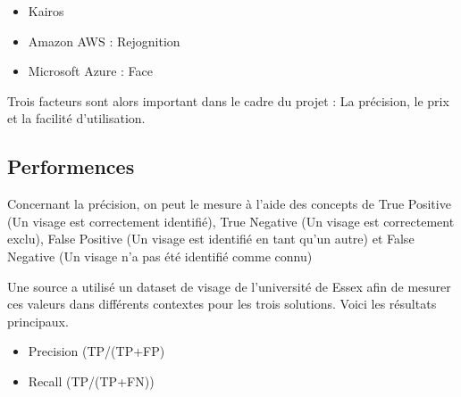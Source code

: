 \begin{itemize}
\item Kairos
\item Amazon AWS : Rejognition
\item Microsoft Azure : Face
\end{itemize}

Trois facteurs sont alors important dans le cadre du projet : La précision, le prix et la facilité d’utilisation.

\subsection{Performences}
Concernant la précision, on peut le mesure à l’aide des concepts de True Positive (Un visage est correctement
identifié), True Negative (Un visage est correctement exclu), False Positive (Un visage est identifié en tant qu’un
autre) et False Negative (Un visage n’a pas été identifié comme connu)

Une source a utilisé un dataset de visage de l’université de Essex afin de mesurer ces valeurs dans différents
contextes pour les trois solutions. Voici les résultats principaux.

\begin{itemize}
\item Precision (TP/(TP+FP)
\item Recall (TP/(TP+FN))
\end{itemize}

